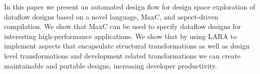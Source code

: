 \documentclass[conference]{IEEEtran}
\begin{document}
In this paper we present an automated design flow for design space
exploration of dataflow designs based on a novel language, MaxC, and
aspect-driven compilation. We show that MaxC can be used to specify
dataflow designs for interesting high-performance applications. We
show that by using LARA to implement aspects that encapsulate
structural transformations as well as design level transformations and
development related transformations we can create maintainable and
portable designs, increasing developer productivity.




\end{document}
